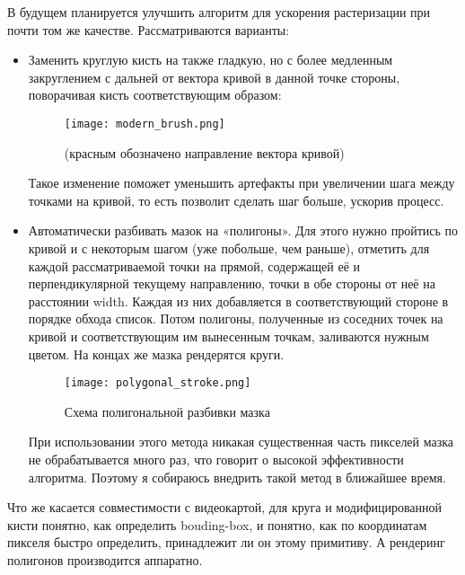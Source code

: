 В будущем планируется улучшить алгоритм для ускорения растеризации при почти том же качестве.
Рассматриваются варианты:
\begin{itemize}
    \item Заменить круглую кисть на также гладкую, но с более медленным закруглением с дальней от вектора кривой в данной точке стороны, поворачивая кисть соответствующим образом:
    \begin{figure}[h!]
        \centering
        \texttt{[image: modern\_brush.png]}
        \caption{(красным обозначено направление вектора кривой)}
        \label{fig:modern_brush}
    \end{figure}
    \FloatBarrier

    Такое изменение поможет уменьшить артефакты при увеличении шага между точками на кривой, то есть позволит сделать шаг больше, ускорив процесс.

    \item Автоматически разбивать мазок на «полигоны».
                Для этого нужно пройтись по кривой и с некоторым шагом (уже побольше, чем раньше),
                отметить для каждой рассматриваемой точки на прямой, содержащей её и перпендикулярной текущему направлению, точки в обе стороны от неё на расстоянии width.
                Каждая из них добавляется в соответствующий стороне в порядке обхода список.
                Потом полигоны, полученные из соседних точек на кривой и соответствующим им вынесенным точкам, заливаются нужным цветом.
                На концах же мазка рендерятся круги.

    \begin{figure}[h!]
        \centering
        \texttt{[image: polygonal\_stroke.png]}
        \caption{Схема полигональной разбивки мазка}
        \label{fig:polygonal_stroke}
    \end{figure}
    \FloatBarrier

    При использовании этого метода никакая существенная часть пикселей мазка не обрабатывается много раз, что говорит о высокой эффективности алгоритма.
    Поэтому я собираюсь внедрить такой метод в ближайшее время.
\end{itemize}

Что же касается совместимости с видеокартой,
для круга и модифицированной кисти понятно, как определить bouding-box,
и понятно, как по координатам пикселя быстро определить, принадлежит ли он этому примитиву.
А рендеринг полигонов производится аппаратно.

